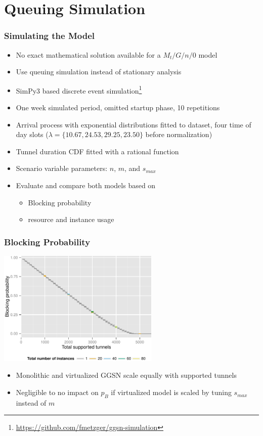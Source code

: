 \documentclass{beamer}
\begin{document}
\section{Queuing Simulation}


\begin{frame}
	\frametitle{Simulating the Model}

	\begin{itemize}
		\item No exact mathematical solution available for a $M_t/G/n/0$ model
		\item Use queuing simulation instead of stationary analysis
		\item SimPy3 based discrete event simulation\footnote{\url{https://github.com/fmetzger/ggsn-simulation}}
		\item One week simulated period, omitted startup phase, 10 repetitions
		\item Arrival process with exponential distributions fitted to dataset, four time of day slots ($\lambda=\{10.67,24.53,29.25,23.50\}$ before normalization)
		\item Tunnel duration CDF fitted with a rational function
		\item Scenario variable parameters: $n$, $m$, and $s_{max}$
		\item Evaluate and compare both models based on
		\begin{itemize}
			\item Blocking probability
			\item resource and instance usage
		\end{itemize}
	\end{itemize}

\end{frame}

\begin{frame}
	\frametitle{Blocking Probability}

	\begin{center}
		\includegraphics[height=5.5cm]{figures/virtual-blocking.pdf}
	\end{center}

	\begin{itemize}
		\item Monolithic and virtualized GGSN scale equally with supported tunnels
		\item Negligible to no impact on $p_B$ if virtualized model is scaled by tuning $s_{max}$ instead of $m$
	\end{itemize}
\end{frame}
\end{document}
